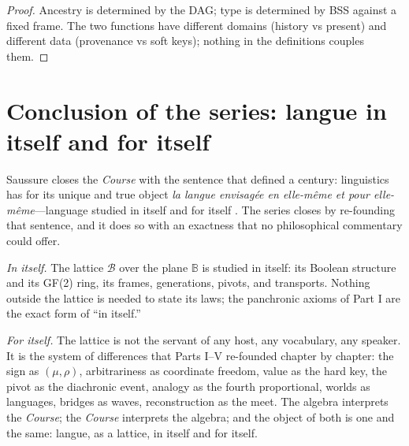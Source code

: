 \documentclass[11pt,a4paper]{article}
\theoremstyle{remark}
\newcommand{\Plane}{\ensuremath{\mathbb{B}}}            %
\newcommand{\Lat}{\ensuremath{\mathcal{B}}}              %
\newcommand{\Ing}{\ensuremath{\mu}}                      %
\newcommand{\Mat}{\ensuremath{\rho}}                     %
\begin{document}
\begin{proof}
Ancestry is determined by the DAG; type is determined by BSS against a
fixed frame. The two functions have different domains (history vs present)
and different data (provenance vs soft keys); nothing in the definitions
couples them.
\end{proof}

\section{Conclusion of the series: langue in itself and for itself}
\label{sec:conclusion}

Saussure closes the \textit{Course} with the sentence that defined a
century: linguistics has for its unique and true object \emph{la langue
envisag\'ee en elle-m\^eme et pour elle-m\^eme}---language studied in itself
and for itself \cite[Conclusion]{harris1983}. The series closes by
re-founding that sentence, and it does so with an exactness that no
philosophical commentary could offer.

\emph{In itself.} The lattice $\Lat$ over the plane $\Plane$ is studied in
itself: its Boolean structure and its GF(2) ring, its frames, generations,
pivots, and transports. Nothing outside the lattice is needed to state its
laws; the panchronic axioms of Part I are the exact form of ``in itself.''

\emph{For itself.} The lattice is not the servant of any host, any
vocabulary, any speaker. It is the system of differences that Parts I--V
re-founded chapter by chapter: the sign as $(\Ing,\Mat)$, arbitrariness as
coordinate freedom, value as the hard key, the pivot as the diachronic
event, analogy as the fourth proportional, worlds as languages, bridges as
waves, reconstruction as the meet. The algebra interprets the
\textit{Course}; the \textit{Course} interprets the algebra; and the object
of both is one and the same: langue, as a lattice, in itself and for itself.
\end{document}
